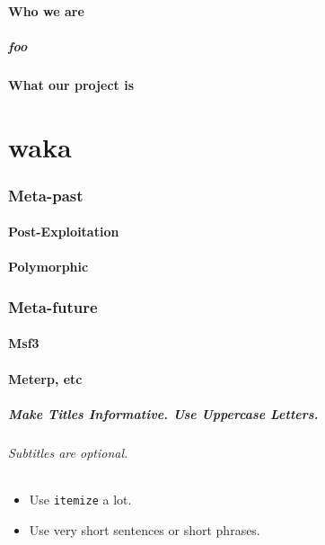\documentclass{beamer}
\begin{document}
\subsection{Who we are}
\begin{frame}
  \frametitle{foo}
\end{frame}
\subsection{What our project is}

\part{waka}
\section{Meta-past}

\subsection{Post-Exploitation}
\subsection{Polymorphic}

\section{Meta-future}

\subsection{Msf3}
\subsection{Meterp, etc}

\begin{frame}
  \frametitle{Make Titles Informative. Use Uppercase Letters.}
  \framesubtitle{Subtitles are optional.}

  \begin{itemize}
  \item
    Use \texttt{itemize} a lot.
  \item
    Use very short sentences or short phrases.
  \end{itemize}
\end{frame}
\end{document}
